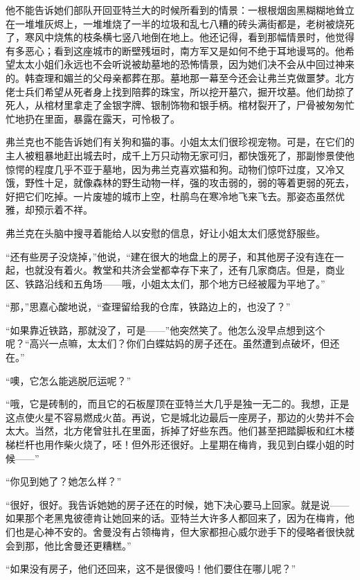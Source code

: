 \par 他不能告诉她们部队开回亚特兰大的时候所看到的情景：一根根烟囱黑糊糊地耸立在一堆堆灰烬上，一堆堆烧了一半的垃圾和乱七八糟的砖头满街都是，老树被烧死了，寒风中烧焦的枝条横七竖八地倒在地上。他还记得，看到那幅情景时，他觉得有多恶心；看到这座城市的断壁残垣时，南方军又是如何不绝于耳地谩骂的。他希望太太小姐们永远也不会听说被劫墓地的恐怖情景，因为她们决不会从中回过神来的。韩查理和媚兰的父母亲都葬在那。墓地那一幕至今还会让弗兰克做噩梦。北方佬士兵们希望从死者身上找到陪葬的珠宝，所以挖开墓穴，掘开坟墓。他们劫掠了死人，从棺材里拿走了金银字牌、银制饰物和银手柄。棺材裂开了，尸骨被匆匆忙忙地扔在里面，暴露在露天，可怜极了。
\par 弗兰克也不能告诉她们有关狗和猫的事。小姐太太们很珍视宠物。可是，在它们的主人被粗暴地赶出城去时，成千上万只动物无家可归，都快饿死了，那副惨景使他惊愕的程度几乎不亚于墓地，因为弗兰克喜欢猫和狗。动物们惊吓过度，又冷又饿，野性十足，就像森林的野生动物一样，强的攻击弱的，弱的等着更弱的死去，好把它们吃掉。一片废墟的城市上空，杜鹃鸟在寒冷地飞来飞去。那姿态虽然优雅，却预示着不祥。
\par 弗兰克在头脑中搜寻着能给人以安慰的信息，好让小姐太太们感觉舒服些。
\par “还有些房子没烧掉，”他说，“建在很大的地盘上的房子，和其他房子没有连在一起，也就没有着火。教堂和共济会堂都幸存下来了，还有几家商店。但是，商业区、铁路沿线和五角场——哦，小姐太太们，那个地方已经被履为平地了。”
\par “那，”思嘉心酸地说，“查理留给我的仓库，铁路边上的，也没了？”
\par “如果靠近铁路，那就没了，可是——”他突然笑了。他怎么没早点想到这个呢？“高兴一点嘛，太太们？你们白蝶姑妈的房子还在。虽然遭到点破坏，但还在。”
\par “噢，它怎么能逃脱厄运呢？”
\par “哦，它是砖制的，而且它的石板屋顶在亚特兰大几乎是独一无二的。我想，正是这点使火星不容易燃成火苗。再说，它是城北边最后一座房子，那边的火势并不会太大。当然，北方佬曾驻扎在里面，拆掉了好些东西。他们甚至把踏脚板和红木楼梯栏杆也用作柴火烧了，呸！但外形还很好。上星期在梅肯，我见到白蝶小姐的时候——”
\par “你见到她了？她怎么样？”
\par “很好，很好。我告诉她她的房子还在的时候，她下决心要马上回家。就是说——如果那个老黑鬼彼德肯让她回来的话。亚特兰大许多人都回来了，因为在梅肯，他们也是心神不安的。舍曼没有占领梅肯，但大家都担心威尔逊手下的侵略者很快就会到那，他比舍曼还更糟糕。”
\par “如果没有房子，他们还回来，这不是很傻吗！他们要住在哪儿呢？”
